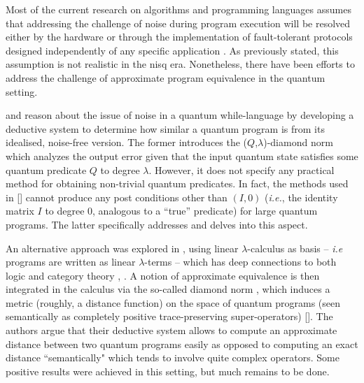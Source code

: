 Most of the current research on algorithms and programming languages assumes that addressing the challenge of noise during program execution will be resolved either by the hardware or through the implementation of fault-tolerant protocols designed independently of any specific application \cite{chong2017programming}. As previously stated, this assumption is not realistic in the \acrshort{nisq} era. Nonetheless, there have been efforts to address the challenge of approximate program equivalence in the quantum setting. 

\cite{hung2019quantitative} and \cite{tao2021gleipnir} reason about the issue of noise in a quantum while-language by developing a deductive system to determine how similar a quantum program is from its idealised, noise-free version. The former introduces the ($Q$,$\lambda$)-diamond norm which analyzes the output error given that the input quantum state satisfies some quantum predicate $Q$ to degree $\lambda$. However, it does not specify any practical method for obtaining non-trivial quantum predicates. In fact, the methods used in [\cite{hung2019quantitative}] cannot produce any post conditions other than $(I,0)$ (\textit{i.e.}, the identity matrix $I$ to degree 0, analogous to a ``true” predicate) for large quantum programs. The latter specifically addresses and delves into this aspect.  

An alternative approach was explored in \cite{dahlqvist2022syntactic}, using linear $\lambda$-calculus as basis – \textit{i.e} programs are written as linear $\lambda$-terms – which has deep connections to both logic and category theory \cite{girard1995advances}, \cite{benton1994mixed}. A notion of approximate equivalence is then
integrated in the calculus via the so-called diamond norm , which induces a metric (roughly, a distance function) on the space of quantum programs (seen semantically as completely positive trace-preserving super-operators) [\cite{watrous2018theory}]. The authors argue that their deductive system allows to compute an approximate distance between two quantum programs easily as opposed to computing an exact distance ``semantically" which tends to involve quite complex operators.  Some positive results were achieved in this setting, but much remains to be done.

